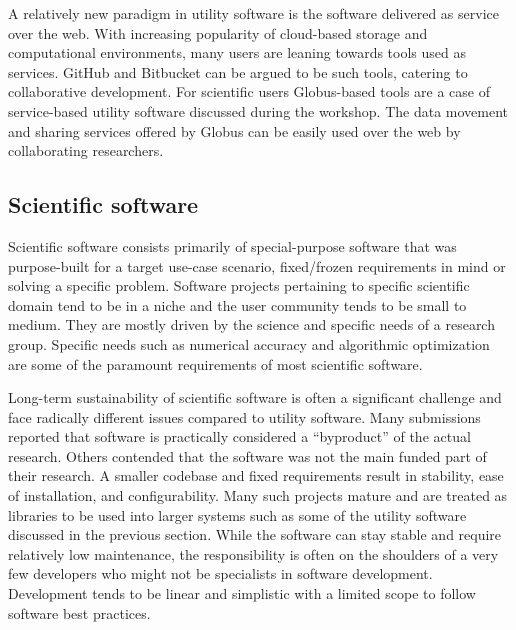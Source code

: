\documentclass[11pt, oneside]{amsart}
\newcommand{\note}[1]{ {\textcolor{red}    { #1 }}}
\newcommand{\toolname}[1] {\textsf{#1}}
\begin{document}
A relatively new paradigm in utility software is the software delivered as
service over the web. With increasing popularity of cloud-based storage and
computational environments, many users are leaning towards tools used as
services. \toolname{GitHub} and \toolname{Bitbucket} can be argued to be
such tools, catering to collaborative development. For scientific users
\toolname{Globus}-based tools are a case of service-based utility software
discussed during the workshop. The data movement and sharing services offered
by Globus can be easily used over the web by collaborating researchers.
%
%
%
%

\subsection{Scientific software}
Scientific software consists primarily of special-purpose software that was
purpose-built for a target use-case scenario,  fixed/frozen requirements in
mind or solving a specific problem. Software projects pertaining to specific
scientific domain tend to be in a niche and the user community tends to be
small to medium. They are mostly driven by the science and specific needs of a
research group. Specific needs such as numerical accuracy and
algorithmic optimization are some of the paramount requirements of most
scientific software.  

Long-term sustainability of scientific software is often a significant
challenge and face radically different issues compared to utility software.
Many submissions reported that software is practically considered a ``byproduct''
of the actual research. Others contended that the software was not the main
funded part of their research. A smaller codebase and fixed requirements result
in stability, ease of installation, and configurability.  Many such projects
mature and are treated as libraries to be used into larger systems such as some
of the utility software discussed in the previous section. While the software
can stay stable and require relatively low maintenance, the responsibility is
often on the shoulders of a very few developers who might not be specialists in
software development. Development tends to be linear and simplistic with a
limited scope to follow software best practices.
\end{document}
